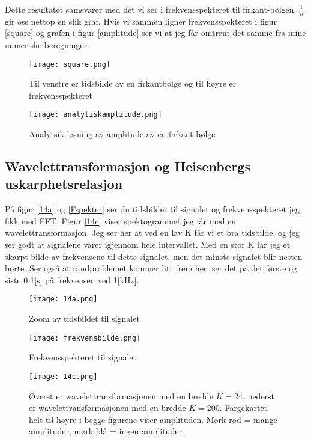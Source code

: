 \documentclass[a4paper,12pt,norsk]{article}
\begin{document}
Dette resultatet samsvarer med det vi ser i frekvensspekteret til firkant-bølgen. $\frac{1}{n}$ gir oss nettop en slik graf. Hvis vi sammen ligner frekvensspekteret i figur \ref{square} og grafen i figur \vref{amplitude} ser vi at jeg får omtrent det samme fra mine numeriske beregninger.

\begin{figure}[h!]
\begin{minipage}{\linewidth}
\texttt{[image: square.png]} 
\caption[Firkantbølge]{Til venstre er tidsbilde av en firkantbølge og til høyre er frekvensspekteret}
\label{square}
\end{minipage}
\hspace{0.5cm}
\begin{minipage}{\linewidth}
\texttt{[image: analytiskamplitude.png]} 
\caption{Analytsik løsning av amplitude av en firkant-bølge}
\label{amplitude}
\end{minipage}
\end{figure}

\subsection{Wavelettransformasjon og Heisenbergs uskarphetsrelasjon}

På figur \ref{14a} og \vref{Fspekter} ser du tidsbildet til signalet og frekvensspekteret jeg fikk med FFT. Figur \vref{14c} viser spektogrammet jeg får med en wavelettransformasjon. Jeg ser her at ved en lav K får vi et bra tidsbilde, og jeg ser godt at signalene varer igjennom hele intervallet. Med en stor K får jeg et skarpt bilde av frekvensene til dette signalet, men det minste signalet blir nesten borte. Ser også at randproblemet kommer litt frem her, ser det på det første og siste 0.1[s] på frekvensen ved 1[kHz].


\begin{figure}[h!]
\begin{minipage}{0.5\linewidth}
\texttt{[image: 14a.png]} 
\caption{Zoom av tidsbildet til signalet}
\label{14a}
\end{minipage}
\hspace{0.5cm}
\begin{minipage}{0.5\linewidth}
\texttt{[image: frekvensbilde.png]} 
\caption[Frekvensspekter ved FFT]{Frekvensspekteret til signalet}
\label{Fspekter}
\end{minipage}
\hspace{0.5cm}
\begin{minipage}{1.05\linewidth}
\texttt{[image: 14c.png]} 
\caption[Wavelet spektrogram]{Øverst er wavelettransformasjonen med en bredde $K = 24$, nederst er wavelettransformasjonen med en bredde $K = 200$. Fargekartet helt til høyre i begge figurene viser amplituden. Mørk rød = mange amplituder, mørk blå = ingen amplituder.}
\label{14c}
\end{minipage}
\end{figure}
\end{document}
